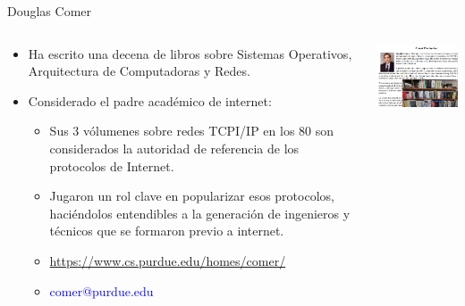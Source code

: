\documentclass[8pt,aspectratio=169,compress]{beamer}
\begin{document}
\begin{frame}{Douglas Comer}

    \begin{columns}[onlytextwidth,T]
      \column{\dimexpr\linewidth-70mm-5mm}

\begin{small}
	\begin{itemize}
\item Ha escrito una decena de libros sobre Sistemas Operativos, Arquitectura de Computadoras y Redes. 

\item Considerado el padre académico de internet:

\begin{itemize}
\item Sus 3 vólumenes sobre redes TCPI/IP en los 80 son considerados la autoridad de referencia de los protocolos de Internet.

\bigskip
\item Jugaron un rol clave en popularizar esos protocolos, haciéndolos entendibles a la generación de ingenieros y técnicos que se formaron previo a internet.
\end{itemize}

\bigskip
\begin{itemize}
\item \textcolor{blue}{\footnotesize \url{https://www.cs.purdue.edu/homes/comer/}}
\item \textcolor{blue}{comer@purdue.edu}
\end{itemize}
\end{itemize}

\end{small}


      \column{70mm}
     \includegraphics[width=60mm]{images/douglas.jpg}

    \end{columns}
\end{frame}
\end{document}
